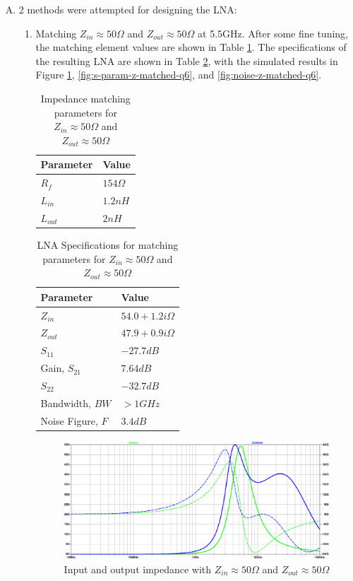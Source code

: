 \documentclass{article}
\begin{document}
\begin{enumerate}[A.]
\item 2 methods were attempted for designing the LNA:
\begin{enumerate}
\item Matching \(Z_{in} \approx 50 \Omega\) and \(Z_{out} \approx 50 \Omega\) at 5.5GHz.
After some fine tuning, the matching element values are shown in Table \ref{tab:param-q6d1}.
The specifications of the resulting LNA are shown in Table \ref{tab:specs-q6d1}, with the simulated results in
Figure \ref{fig:zin-zout-z-matched-q6}, \ref{fig:s-param-z-matched-q6}, and \ref{fig:noise-z-matched-q6}.
\begin{table}[htbp]
\caption{\label{tab:param-q6d1}Impedance matching parameters for \(Z_{in} \approx 50 \Omega\) and \(Z_{out} \approx 50 \Omega\)}
\centering
\begin{tabular}{ll}
\hline
Parameter & Value\\
\hline
\(R_{f}\) & \(154 \Omega\)\\
\(L_{in}\) & \(1.2 nH\)\\
\(L_{out}\) & \(2 nH\)\\
\hline
\end{tabular}
\end{table}

\begin{table}[htbp]
\caption{\label{tab:specs-q6d1}LNA Specifications for matching parameters for \(Z_{in} \approx 50 \Omega\) and \(Z_{out} \approx 50 \Omega\)}
\centering
\begin{tabular}{ll}
\hline
Parameter & Value\\
\hline
\(Z_{in}\) & \(54.0 + 1.2i \Omega\)\\
\(Z_{out}\) & \(47.9 + 0.9i \Omega\)\\
\(S_{11}\) & \(-27.7 dB\)\\
Gain, \(S_{21}\) & \(7.64 dB\)\\
\(S_{22}\) & \(-32.7 dB\)\\
Bandwidth, \(BW\) & \(> 1 GHz\)\\
Noise Figure, \(F\) & \(3.4 dB\)\\
\hline
\end{tabular}
\end{table}

\begin{figure}[H]
\centering
\includegraphics[width=.9\linewidth]{img/q6/zin-zout-z-matched.pdf}
\caption{\label{fig:zin-zout-z-matched-q6}Input and output impedance with \(Z_{in} \approx 50 \Omega\) and \(Z_{out} \approx 50 \Omega\)}
\end{figure}


\end{enumerate}
\end{enumerate}
\end{document}
